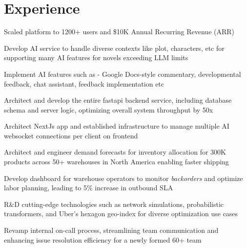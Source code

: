 \documentclass[]{deedy-resume-openfont}
\begin{document}
\hfill
\begin{minipage}[t]{0.66\textwidth} 


\section{Experience}

\vspace{\topsep} %
\begin{tightemize}
\item Scaled platform to 1200+ users and \$10K Annual Recurring Revenue (ARR)
\item Develop AI service to handle diverse contexts like plot, characters, etc for supporting many AI features for novels exceeding LLM limits
\item Implement AI features such as - Google Docs-style commentary, developmental feedback, chat assistant, feedback implementation etc
\item Architect and develop the entire fastapi backend service, including database schema and server logic, optimizing overall system throughput by 50x
\item Architect NextJs app and established infrastructure to manage multiple AI websocket connections per client on frontend
\end{tightemize}
\sectionsep

\begin{tightemize}
\item Architect and engineer demand forecasts for inventory allocation for 300K products across 50+ warehouses in North America enabling faster shipping
\item Develop dashboard for warehouse operators to monitor \textit{backorders} and optimize labor planning, leading to 5\% increase in outbound SLA
\item R\&D cutting-edge technologies such as network simulations, probabilistic transformers, and Uber's hexagon geo-index for diverse optimization use cases
\item Revamp internal on-call process, streamlining team communication and enhancing issue resolution efficiency for a newly formed 60+ team


\end{tightemize}
\end{minipage}
\end{document}
